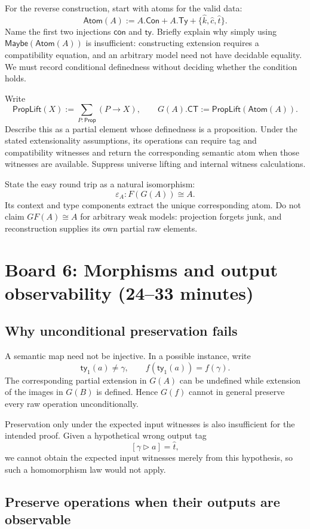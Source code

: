 \documentclass[11pt]{article}
\newcommand{\Con}{\mathsf{Con}}
\newcommand{\Ty}{\mathsf{Ty}}
\newcommand{\CT}{\mathsf{CT}}
\newcommand{\PropLift}{\mathsf{PropLift}}
\newcommand{\Atom}{\mathsf{Atom}}
\newcommand{\ext}{\mathbin{\triangleright}}
\newcommand{\ctag}{\widehat c}
\newcommand{\ttag}{\widehat t}
\newcommand{\kterm}{\widehat k}
\newcommand{\tyone}{\mathsf{ty}_1}
\begin{document}
For the reverse construction, start with atoms for the valid data:
\[
 \Atom(A):=A.\Con+A.\Ty+\{\kterm,\ctag,\ttag\}.
\]
Name the first two injections \(\mathsf{con}\) and \(\mathsf{ty}\).
Briefly explain why simply using \(\mathsf{Maybe}(\Atom(A))\) is insufficient:
constructing extension requires a compatibility equation, and an arbitrary
model need not have decidable equality. We must record conditional
definedness without deciding whether the condition holds.

Write
\[
 \PropLift(X):=\sum_{P:\mathsf{Prop}}(P\to X),
 \qquad G(A).\CT:=\PropLift(\Atom(A)).
\]
Describe this as a partial element whose definedness is a proposition.
Under the stated extensionality assumptions, its operations can require
tag and compatibility witnesses and return the corresponding semantic atom
when those witnesses are available. Suppress universe lifting and internal
witness calculations.

State the easy round trip as a natural isomorphism:
\[
 \varepsilon_A:F(G(A))\cong A.
\]
Its context and type components extract the unique corresponding atom.
Do not claim \(GF(A)\cong A\) for arbitrary weak models: projection forgets
junk, and reconstruction supplies its own partial raw elements.

\section*{Board 6: Morphisms and output observability (24--33 minutes)}

\subsection*{Why unconditional preservation fails}

A semantic map need not be injective. In a possible instance, write
\[
 \tyone(a)\ne\gamma,
 \qquad f(\tyone(a))=f(\gamma).
\]
The corresponding partial extension in \(G(A)\) can be undefined while
extension of the images in \(G(B)\) is defined. Hence \(G(f)\) cannot in
general preserve every raw operation unconditionally.

Preservation only under the expected input witnesses is also insufficient
for the intended proof. Given a hypothetical wrong output tag
\[
 [\gamma\ext a]=\ttag,
\]
we cannot obtain the expected input witnesses merely from this hypothesis,
so such a homomorphism law would not apply.

\subsection*{Preserve operations when their outputs are observable}
\end{document}
